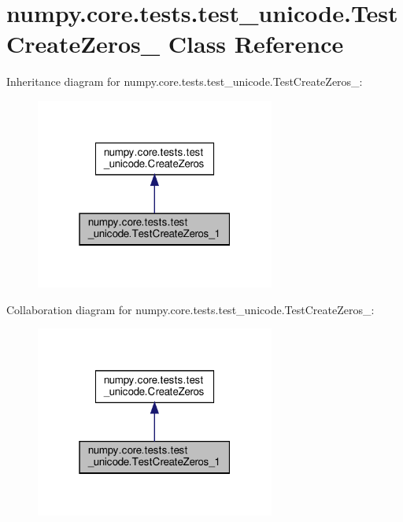 \hypertarget{classnumpy_1_1core_1_1tests_1_1test__unicode_1_1TestCreateZeros__1}{}\section{numpy.\+core.\+tests.\+test\+\_\+unicode.\+Test\+Create\+Zeros\+\_ Class Reference}
\label{classnumpy_1_1core_1_1tests_1_1test__unicode_1_1TestCreateZeros__1}


Inheritance diagram for numpy.\+core.\+tests.\+test\+\_\+unicode.\+Test\+Create\+Zeros\+\_\+:
\nopagebreak
\begin{figure}[H]
\begin{center}
\leavevmode
\includegraphics[width=223pt]{classnumpy_1_1core_1_1tests_1_1test__unicode_1_1TestCreateZeros__1__inherit__graph}
\end{center}
\end{figure}


Collaboration diagram for numpy.\+core.\+tests.\+test\+\_\+unicode.\+Test\+Create\+Zeros\+\_\+:
\nopagebreak
\begin{figure}[H]
\begin{center}
\leavevmode
\includegraphics[width=223pt]{classnumpy_1_1core_1_1tests_1_1test__unicode_1_1TestCreateZeros__1__coll__graph}
\end{center}
\end{figure}
